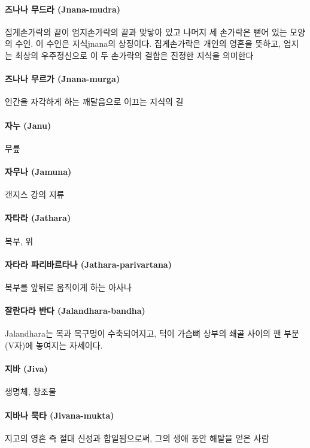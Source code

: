 \documentclass[12pt, a4paper, oneside]{book}
\begin{document}
\paragraph{즈나나 무드라 (Jnana-mudra)}
집게손가락의 끝이 엄지손가락의 끝과 맞닿아 있고 나머지 세 손가락은 뻗어 있는 모양의 수인. 이 수인은 지식jnana의 상징이다. 집게손가락은 개인의 영혼을 뜻하고, 엄지는 최상의 우주정신으로 이 두 손가락의 결합은 진정한 지식을 의미한다

\paragraph{즈나나 무르가 (Jnana-murga)}
인간을 자각하게 하는 깨달음으로 이끄는 지식의 길

\paragraph{자누 (Janu)}
무릎

\paragraph{자무나 (Jamuna)}
갠지스 강의 지류

\paragraph{자타라 (Jathara)}
복부, 위

\paragraph{자타라 파리바르타나 (Jathara-parivartana)}
복부를 앞뒤로 움직이게 하는 아사나

\paragraph{잘란다라 반다 (Jalandhara-bandha)}
Jalandhara는 목과 목구멍이 수축되어지고, 턱이 가슴뼈 상부의 쇄골 사이의 팬 부분(V자)에 놓여지는 자세이다.

\paragraph{지바 (Jiva)}
생명체, 창조물

\paragraph{지바나 묵타 (Jivana-mukta)}
지고의 영혼 즉 절대 신성과 합일됨으로써, 그의 생애 동안 해탈을 얻은 사람
\end{document}
